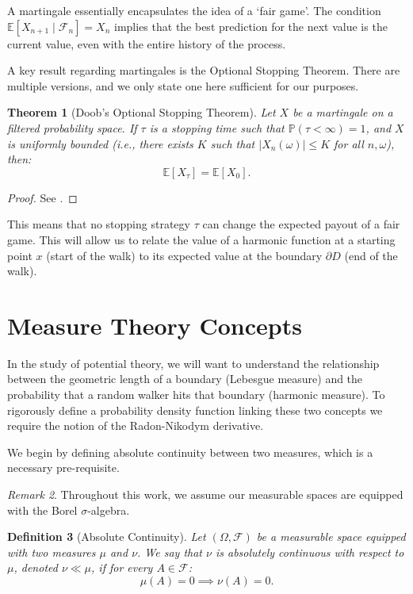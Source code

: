 \documentclass[12pt, a4paper, oneside]{report}
\newtheorem{theorem}{Theorem}[chapter]
\newtheorem{definition}[theorem]{Definition}
\theoremstyle{remark}
\newtheorem{remark}[theorem]{Remark}
\begin{document}
\noindent  A martingale essentially encapsulates the idea of a `fair game'. The condition $\mathbb{E}[X_{n+1} \mid \mathcal{F}_n] = X_n$ implies that the best prediction for the next value is the current value, even with the entire history of the process. 

\noindent A key result regarding martingales is the Optional Stopping Theorem. There are multiple versions, and we only state one here sufficient for our purposes.
\begin{theorem}[Doob's Optional Stopping Theorem]
\label{thm:ost}
    Let $X$ be a martingale on a filtered probability space. If $\tau$ is a stopping time such that $\mathbb{P}(\tau < \infty) = 1$, and $X$ is uniformly bounded (i.e., there exists $K$ such that $|X_n(\omega)| \leq K$ for all $n, \omega$), then:
\begin{equation*}
    \mathbb{E}[X_\tau] = \mathbb{E}[X_0].
\end{equation*}
\end{theorem}

\begin{proof}
See \citet[Section 10.10]{Williams1991}.
\end{proof}

\noindent This means that no stopping strategy $\tau$ can change the expected payout of a fair game. This will allow us to relate the value of a harmonic function at a starting point $x$ (start of the walk) to its expected value at the boundary $\partial D$ (end of the walk).

\section{Measure Theory Concepts}

In the study of potential theory, we will want to understand the relationship between the geometric length of a boundary (Lebesgue measure) and the probability that a random walker hits that boundary (harmonic measure). To rigorously define a probability density function linking these two concepts we require the notion of the Radon-Nikodym derivative.


We begin by defining absolute continuity between two measures, which is a necessary pre-requisite.
\begin{remark}
Throughout this work, we assume our measurable spaces are equipped with the Borel $\sigma$-algebra.

\end{remark} 

\begin{definition}[Absolute Continuity]
Let $(\Omega, \mathcal{F})$ be a measurable space equipped with two measures $\mu$ and $\nu$. We say that $\nu$ is absolutely continuous with respect to $\mu$, denoted $\nu \ll \mu$, if for every $A \in \mathcal{F}$:
\begin{equation*}
    \mu(A) = 0 \implies \nu(A) = 0.
\end{equation*}
\end{definition}
\end{document}
